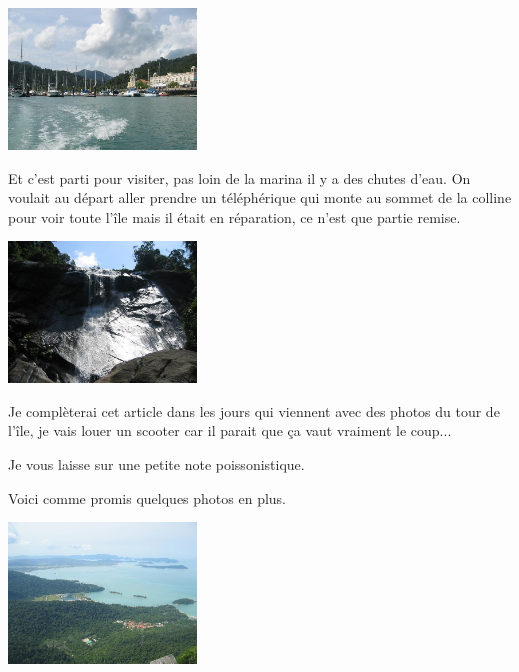 \begin{multicols}{2}
\smallbreak
\hspace*{-0.65cm}
\includegraphics[width=5cm]{articles/langkawi/1211018457DniB.jpg}
\smallbreak

Et c'est parti pour visiter, pas loin de la marina il y a des chutes d'eau. On voulait au départ aller prendre un téléphérique qui monte au sommet de la colline pour voir toute l'île mais il était en réparation, ce n'est que partie remise.

\smallbreak
\hspace*{-0.65cm}
\includegraphics[width=5cm]{articles/langkawi/1211018190Pmip.jpg}
\smallbreak

Je complèterai cet article dans les jours qui viennent avec des photos du tour de l'île, je vais louer un scooter car il parait que ça vaut vraiment le coup...

Je vous laisse sur une petite note poissonistique.


Voici comme promis quelques photos en plus.

\smallbreak
\hspace*{-0.65cm}
\includegraphics[width=5cm]{articles/langkawi/1212397933wQ6v.jpg}
\smallbreak


\end{multicols}
